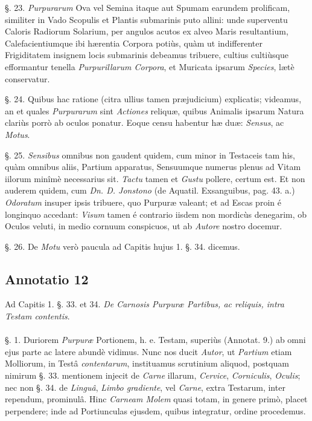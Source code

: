 \documentclass[a4paper, 11pt, oneside, polutonikogreek, german]{article}
\begin{document}
§. 23. \emph{Purpurarum} Ova vel Semina itaque aut Spumam earundem prolificam, similiter in Vado Scopulis et Plantis submarinis puto allini: unde superventu Caloris Radiorum Solarium, per angulos acutos ex alveo Maris resultantium, Calefacientiumque ibi hærentia Corpora potiùs, quàm ut indifferenter Frigiditatem insignem locis submarinis debeamus tribuere, cultius cultiùsque efformantur tenella \emph{Purpurillarum Corpora}, et Muricata ipsarum \emph{Species}, lætè conservatur.

§. 24. Quibus hac ratione (citra ullius tamen præjudicium) explicatis; videamus, an et quales \emph{Purpurarum} sint \emph{Actiones} reliquæ, quibus Animalis ipsarum Natura clariùs porrò ab oculos ponatur. Eoque censu habentur hæ duæ: \emph{Sensus}, ac \emph{Motus}.

§. 25. \emph{Sensibus} omnibus non gaudent quidem, cum minor in Testaceis tam his, quàm omnibus aliis, Partium apparatus, Sensuumque numerus plenus ad Vitam iilorum minîmè necessarius sit. \emph{Tactu} tamen et \emph{Gustu} pollere, certum est. Et non auderem quidem, cum \emph{Dn. D. Jonstono} (de Aquatil. Exsanguibus, pag. 43. a.) \emph{Odoratum} insuper ipsis tribuere, quo Purpuræ valeant; et ad Escas proin é longinquo accedant: \emph{Visum} tamen é contrario iisdem non mordicùs denegarim, ob Oculos veluti, in medio cornuum conspicuos, ut ab \emph{Autore} nostro docemur.

§. 26. De \emph{Motu} verò paucula ad Capitis hujus 1. §. 34. dicemus.

\subsection{Annotatio 12}
\begin{center}
Ad Capitis 1. §. 33. et 34. \emph{De Carnosis Purpuræ Partibus, ac reliquis, intra Testam contentis}.
\end{center}
\paragraph{}
§. 1. Duriorem \emph{Purpuræ} Portionem, h. e. Testam, superiùs (Annotat. 9.) ab omni ejus parte ac latere abundè vidimus. Nunc nos ducit \emph{Autor}, ut \emph{Partium} etiam Molliorum, in Testâ \emph{contentarum}, instituamus scrutinium aliquod, postquam nimirum §. 33. mentionem injecit de \emph{Carne} illarum, \emph{Cervice}, \emph{Corniculis}, \emph{Oculis}; nec non §. 34. de \emph{Linguâ}, \emph{Limbo gradiente}, vel \emph{Carne}, extra Testarum, inter rependum, prominulâ. Hinc \emph{Carneam Molem} quasi totam, in genere primò, placet perpendere; inde ad Portiunculas ejusdem, quibus integratur, ordine procedemus.
\end{document}
